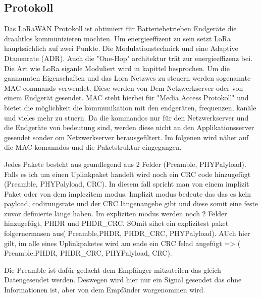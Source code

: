 \documentclass[a4paper,12pt]{article}
\begin{document}
        \subsection{Protokoll} \label{sec:protokoll}
            Das LoRaWAN Protokoll ist obtimiert für Batteriebetrieben Endgeräte die draahtlos kommunizieren möchten. Um energieeffizent zu sein setzt LoRa hauptsächlich auf zwei Punkte. Die Modulationstechnick und eine Adaptive Dtanenrate (ADR). Auch die 
            "One-Hop" architektur trät zur energieeffizenz bei. Die Art wie LoRa siganle Moduliert wird in kapittel  besprochen. Um die gannannten Eigenschaften und das Lora Netzwes zu steuern werden sogenannte MAC commands verwendet. 
            Diese werden von Dem Netzwerkserver oder von einem Endgerät gesendet. MAC steht hierbei für "Media Access Protokoll" und bietet die möglichkeit die kommunikation mit den endgeräten, frequenzen, kanäle und vieles mehr zu stuern. 
            Da die kommandos nur für den Netzwerkserver und die Endgeräte von bedeutung sind, werden diese nicht an den Applikationsserver gesendet sonder om Netzwerkserver herausgefiltert. Im folgenen wird näher auf die MAC komanndos und die Paketstruktur eingegangen.

            Jedes Pakete besteht aus grundlegend aus 2 Felder (Preamble,  PHYPalyload).  Falls es ich um einen Uplinkpaket handelt wird noch ein CRC code hinzugefügt   (Preamble,  PHYPalyload, CRC). 
            In diesem fall spricht man von einem implizit Paket oder von dem implezitem modus. Implizit modus bedeute das das es kein payload, codirungsrate und der CRC längenangebe gibt und diese somit eine feste zuvor definierte länge haben. Im expliziten modus werden noch 2 Felder hinzugefügt, 
            PHDR und PHDR\_CRC. SOmit sihet ein explizitest paket folgernermasen aus( Preamble,PHDR, PHDR\_CRC, PHYPalyload). AUch hier gilt, im alle eines Uplinkpaketes wird am ende ein CRC felad angefügt => ( Preamble,PHDR, PHDR\_CRC, PHYPalyload, CRC).
            
            Die Preamble ist dafür gedacht dem Empfänger mitzuteilen das gleich Datengesendet werden. Deswegen wird hier nur ein Signal gesendet das ohne Informationen ist, aber von dem Empfänder wargenommen wird.
\end{document}
